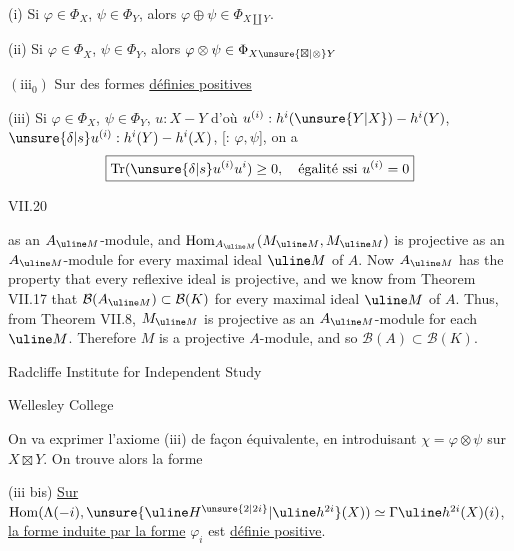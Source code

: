 (i) Si $\varphi\in\Phi_X$, $\psi\in\Phi_Y$, alors
$\varphi\oplus\psi\in\Phi_{X\amalg Y}$.

(ii) Si $\varphi\in\Phi_X$, $\psi\in\Phi_Y$,
alors $\varphi\otimes\psi\in\Phi_{X\unsure{\boxtimes|\otimes}Y}$

$(\mathrm{iii}_0)$ Sur
des formes \uline{définies positives}
\margin{[il suffit $X=e$ \deleted{\unsure{lorsque}}]}

 

(iii) Si $\varphi\in\Phi_X$, $\psi\in\Phi_Y$,
$u:X\mathbin{-}Y$ d'où
$u^{(i)}:h^i(\unsure{Y|X})\mathbin{-}h^i(Y)$,
 $\unsure{\delta|s}u^{(i)}:h^i(Y)\mathbin{-}h^i(X)$,
[: $\varphi,\psi$], on a
\[
\boxed{\operatorname{Tr}(\unsure{\delta|s}u^{(i)}u^i)\geq0,
\quad\text{égalité ssi }u^{(i)}=0}
\]

VII.20

as an $A_{\uline M}$-module, and
$\operatorname{Hom}_{A_{\uline M}}(M_{\uline M},M_{\uline M})$ is projective as an
$A_{\uline M}$-module for every maximal ideal $\uline M$ of $A$. Now $A_{\uline M}$ has the
property that every reflexive ideal is projective, and we know from
Theorem VII.17 that $\mathcal B(A_{\uline M})\subset\mathcal B(K)$ for every maximal ideal $\uline M$
of $A$. Thus, from Theorem VII.8, $M_{\uline M}$ is projective as an
$A_{\uline M}$-module for each $\uline M$. Therefore $M$ is a projective $A$-module,
and so $\mathcal B(A)\subset\mathcal B(K)$.

Radcliffe Institute for Independent Study

Wellesley College

On va exprimer l'axiome (iii) de façon équivalente,
en introduisant $\chi=\varphi\otimes\psi$ sur $X\boxtimes Y$.
On trouve alors
la forme

(iii bis) \uline{Sur} 
$\operatorname{Hom}(\Lambda(-i),\unsure{\uline H^{\unsure{2|2i}}|\uline h^{2i}}(X))
\simeq\Gamma\uline h^{2i}(X)(i)$,
\uline{la forme induite par la forme} $\varphi_i$ est \uline{définie positive}.

